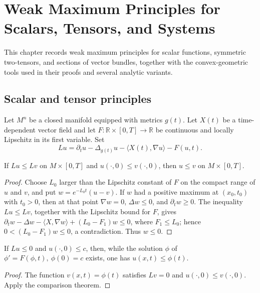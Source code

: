 \chapter{Weak Maximum Principles for Scalars, Tensors, and Systems}
\label{chow-ii-ch10-weak-maximum-principles}

This chapter records weak maximum principles for scalar functions, symmetric
two-tensors, and sections of vector bundles, together with the convex-geometric
tools used in their proofs and several analytic variants.

\section{Scalar and tensor principles}

\begin{definition}
\label{def:chow-ii-semilinear-heat-operator}
Let $M^n$ be a closed manifold equipped with metrics $g(t)$.  Let $X(t)$ be a
time-dependent vector field and let $F:\mathbb R\times[0,T]\to\mathbb R$ be
continuous and locally Lipschitz in its first variable.  Set
\[
 Lu=\partial_tu-\Delta_{g(t)}u-\langle X(t),\nabla u\rangle-F(u,t).
\]
\end{definition}

\begin{theorem}
\label{thm:chow-ii-scalar-comparison}
If $Lu\le Lv$ on $M\times[0,T]$ and $u(\cdot,0)\le v(\cdot,0)$, then
\(u\le v\) on $M\times[0,T]$.
\end{theorem}
\begin{proof}
Choose $L_0$ larger than the Lipschitz constant of $F$ on the compact range of
$u$ and $v$, and put $w=e^{-L_0t}(u-v)$.  If $w$ had a positive maximum at
$(x_0,t_0)$ with $t_0>0$, then at that point
\(\nabla w=0\), $\Delta w\le0$, and $\partial_tw\ge0$.  The inequality
\(Lu\le Lv\), together with the Lipschitz bound for $F$, gives
\(\partial_tw-\Delta w-\langle X,\nabla w\rangle+(L_0-F_1)w\le0\), where
$F_1\le L_0$; hence $0< (L_0-F_1)w\le0$, a contradiction.  Thus $w\le0$.
\end{proof}

\begin{theorem}
\label{thm:chow-ii-scalar-wmp}
If $Lu\le0$ and $u(\cdot,0)\le c$, then, while the solution $\phi$ of
\(\phi'=F(\phi,t),\ \phi(0)=c\) exists, one has $u(x,t)\le\phi(t)$.
\end{theorem}
\begin{proof}
The function $v(x,t)=\phi(t)$ satisfies $Lv=0$ and $u(\cdot,0)\le v(\cdot,0)$.
Apply the comparison theorem.
\end{proof}

